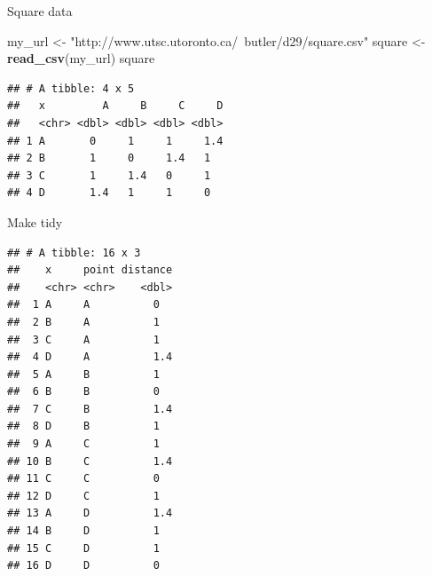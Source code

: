 \documentclass[ignorenonframetext,]{beamer}
\newenvironment{Shaded}{\begin{snugshade}}{\end{snugshade}}
\newcommand{\DecValTok}[1]{\textcolor[rgb]{0.00,0.00,0.81}{#1}}
\newcommand{\KeywordTok}[1]{\textcolor[rgb]{0.13,0.29,0.53}{\textbf{#1}}}
\newcommand{\NormalTok}[1]{#1}
\newcommand{\OperatorTok}[1]{\textcolor[rgb]{0.81,0.36,0.00}{\textbf{#1}}}
\newcommand{\StringTok}[1]{\textcolor[rgb]{0.31,0.60,0.02}{#1}}
\begin{document}
\begin{frame}[fragile]{Square data}
\protect\hypertarget{square-data}{}

\begin{Shaded}
\begin{Highlighting}[]
\NormalTok{my_url <-}\StringTok{ "http://www.utsc.utoronto.ca/~butler/d29/square.csv"}
\NormalTok{square <-}\StringTok{ }\KeywordTok{read_csv}\NormalTok{(my_url)}
\NormalTok{square}
\end{Highlighting}
\end{Shaded}

\begin{verbatim}
## # A tibble: 4 x 5
##   x         A     B     C     D
##   <chr> <dbl> <dbl> <dbl> <dbl>
## 1 A       0     1     1     1.4
## 2 B       1     0     1.4   1  
## 3 C       1     1.4   0     1  
## 4 D       1.4   1     1     0
\end{verbatim}

\end{frame}

\begin{frame}[fragile]{Make tidy}
\protect\hypertarget{make-tidy}{}

\begin{Shaded}
\end{Shaded}

\begin{verbatim}
## # A tibble: 16 x 3
##    x     point distance
##    <chr> <chr>    <dbl>
##  1 A     A          0  
##  2 B     A          1  
##  3 C     A          1  
##  4 D     A          1.4
##  5 A     B          1  
##  6 B     B          0  
##  7 C     B          1.4
##  8 D     B          1  
##  9 A     C          1  
## 10 B     C          1.4
## 11 C     C          0  
## 12 D     C          1  
## 13 A     D          1.4
## 14 B     D          1  
## 15 C     D          1  
## 16 D     D          0
\end{verbatim}

\end{frame}
\end{document}
